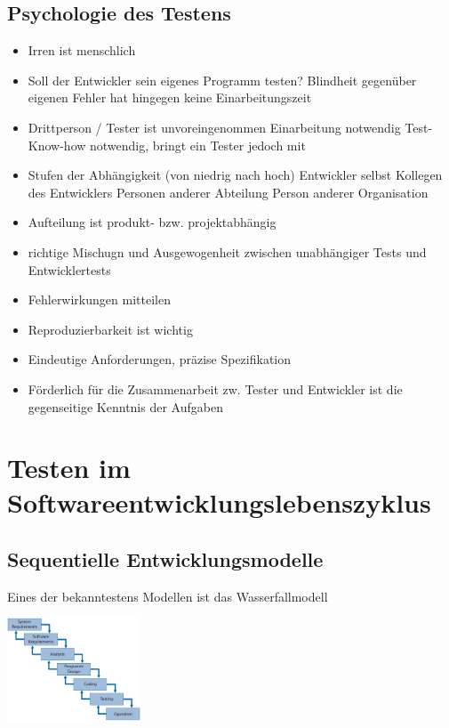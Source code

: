 \documentclass{report}
\newenvironment{Figure}
	{\par\medskip\noindent\minipage{\linewidth}}
	{\endminipage\par\medskip}
\theoremstyle{definition}
\theoremstyle{example}
\begin{document}
\section{Psychologie des Testens}
\begin{itemize}
   \item Irren ist menschlich
   \item Soll der Entwickler sein eigenes Programm testen?
   \subitem Blindheit gegenüber eigenen Fehler
   \subitem hat hingegen keine Einarbeitungszeit
   \item Drittperson / Tester
   \subitem ist unvoreingenommen
   \subitem Einarbeitung notwendig 
   \subitem Test-Know-how notwendig, bringt ein Tester jedoch mit
   \item Stufen der Abhängigkeit (von niedrig nach hoch)
   \subitem Entwickler selbst
   \subitem Kollegen des Entwicklers
   \subitem Personen anderer Abteilung
   \subitem Person anderer Organisation
   \item Aufteilung ist produkt- bzw. projektabhängig
   \item richtige Mischugn und Ausgewogenheit zwischen unabhängiger Tests und Entwicklertests 
   \item Fehlerwirkungen mitteilen
   \item Reproduzierbarkeit ist wichtig
   \item Eindeutige Anforderungen, präzise Spezifikation
   \item Förderlich für die Zusammenarbeit zw. Tester und Entwickler ist die gegenseitige Kenntnis der Aufgaben
\end{itemize}

\chapter{Testen im Softwareentwicklungslebenszyklus}

\section{Sequentielle Entwicklungsmodelle}
Eines der bekanntestens Modellen ist das Wasserfallmodell

\begin{Figure}
   \centering
    \includegraphics[width=150px]{img/Wasserfallmodell.png}
        \label{fig:Wasserfallmodell}
\end{Figure}
\end{document}
